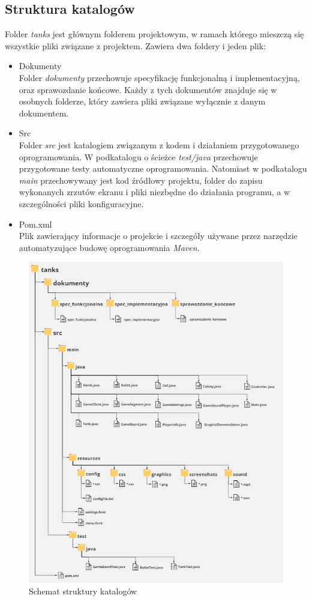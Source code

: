 \documentclass[11pt,a4paper]{report}
\begin{document}
\subsection {Struktura katalogów}
Folder \textsl{tanks} jest głównym folderem projektowym, w ramach którego mieszczą się wszystkie pliki związane z projektem. Zawiera dwa foldery i jeden plik: 
\begin{itemize}
\item{Dokumenty}\\
Folder \textsl{dokumenty} przechowuje specyfikację funkcjonalną i implementacyjną, oraz sprawozdanie końcowe. Każdy z tych dokumentów znajduje się w osobnych folderze, który zawiera pliki związane wyłącznie z danym dokumentem.
\item{Src}\\
Folder \textsl{src} jest katalogiem związanym z kodem i działaniem przygotowanego oprogramowania. W podkatalogu o ścieżce \textsl{test/java} przechowuje przygotowane testy automatyczne oprogramowania. Natomiast w podkatalogu \textsl{main} przechowywany jest kod źródłowy projektu, folder do zapisu wykonanych zrzutów ekranu i pliki niezbędne do działania programu, a w szczególności pliki konfiguracyjne. 
\item{Pom.xml}\\
Plik zawierający informacje o projekcie i szczegóły używane przez narzędzie automatyzujące budowę oprogramowania \textsl{Maven}.

\end{itemize}
\newpage
\begin{figure}[!ht]
\centerline{\includegraphics{img/struktura.png}}
\caption{Schemat struktury katalogów}
\end{figure}
\newpage
\end{document}
